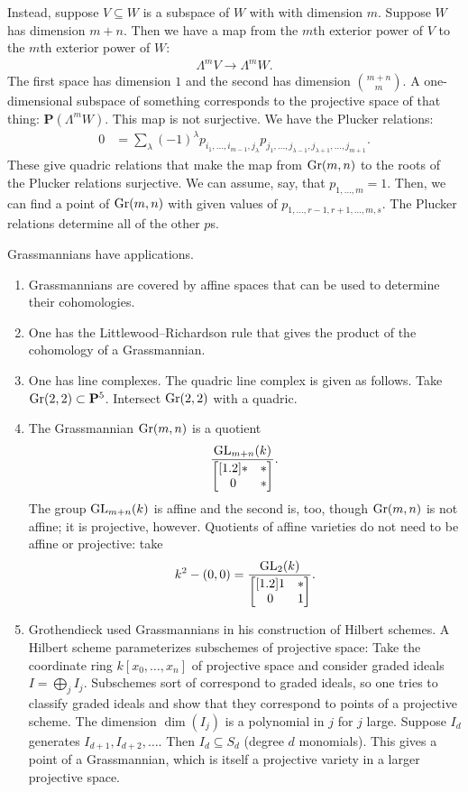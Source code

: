 \documentclass [11 pt, oneside, margin = 1 in] {article}
\begin{document}
Instead, suppose $V\subseteq W$ is a subspace of $W$ with with dimension $m$. Suppose $W$ has dimension $m+n$. Then we have a map from the $m$th exterior power of $V$ to the $m$th exterior power of $W$:
\begin{align*}
	\Lambda^m V \longrightarrow  \Lambda ^m W.
\end{align*}
The first space has dimension $1$ and the second has dimension $\binom{m+n}{m}$. A one-dimensional subspace of something corresponds to the projective space of that thing: $\mathbf{P}(\Lambda^m W)$. This map is not surjective. We have the Plucker relations:
\begin{align*}
	0 &= \sum_{\lambda}^{} (-1)^\lambda p_{i_1,\hdots, i_{m-1},j_\lambda} p_{j_1,\hdots, j_{\lambda -1},j_{\lambda+1},\hdots, j_{m+1}}.
\end{align*}
These give quadric relations that make the map from $\operatorname{Gr}(m,n)$ to the roots of the Plucker relations surjective. We can assume, say, that $p_{1,\hdots, m} = 1$. Then, we can find a point of $\operatorname{Gr}(m,n)$ with given values of $p_{1,\hdots, r-1,r+1,\hdots, m,s}$. The Plucker relations determine all of the other $p$s.

Grassmannians have applications.
\begin{enumerate}
	\item Grassmannians are covered by affine spaces that can be used to determine their cohomologies.
	\item One has the Littlewood--Richardson rule that gives the product of the cohomology of a Grassmannian.
	\item One has line complexes. The quadric line complex is given as follows. Take $\operatorname{Gr}(2,2)\subset  \mathbf{P}^5$. Intersect $\operatorname{Gr}(2,2)$ with a quadric.
	\item The Grassmannian $\operatorname{Gr}(m,n)$ is a quotient \[\frac{\operatorname{GL}_{m+n}(k)}{\begin{bmatrix} [ 1.2 ] *&*\\0&*\end{bmatrix}}.\] The group $\operatorname{GL}_{m+n}(k)$ is affine and the second is, too, though $\operatorname{Gr}(m,n)$ is not affine; it is projective, however. Quotients of affine varieties do not need to be affine or projective: take 
		\begin{align*}
			k^2 - (0,0) =  \frac{\operatorname{GL}_{2}(k) }{\begin{bmatrix} [ 1.2 ] 1&*\\0&1\end{bmatrix}}.
		\end{align*}
	\item Grothendieck used Grassmannians in his construction of Hilbert schemes. A Hilbert scheme parameterizes subschemes of projective space: Take the coordinate ring $k[x_0,\hdots, x_n]$ of projective space and consider graded ideals $I = \bigoplus_j I_j$. Subschemes sort of correspond to graded ideals, so one tries to classify graded ideals and show that they correspond to points of a projective scheme. The dimension $\dim (I_j)$ is a polynomial in $j$ for $j$ large. Suppose $I_d$ generates $I_{d+1},I_{d+2},\hdots$. Then $I_d \subseteq S_d$ (degree $d$ monomials). This gives a point of a Grassmannian, which is itself a projective variety in a larger projective space.
\end{enumerate}
\end{document}

